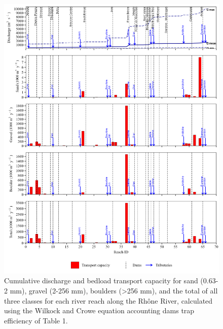 \documentclass[
]{book}
\begin{document}
\begin{figure}
\includegraphics[width=26.24in]{img/res_cascade/res_E2_eW&C/plots_tr_cap-silt/tr_cap_res_sum_hy_E2_eW&C} \caption{Cumulative discharge and bedload transport capacity for sand (0.63-2 mm), gravel (2-256 mm), boulders (>256 mm), and the total of all three classes for each river reach along the Rhône River, calculated using the Wilkock and Crowe equation accounting dams trap efficiency of Table 1.}\label{fig:TrcE2eW}
\end{figure}
\end{document}
